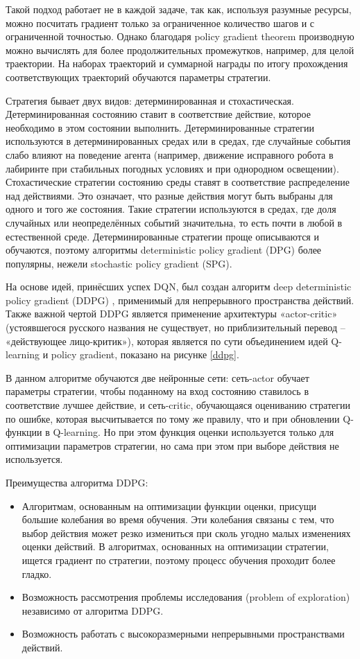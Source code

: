 Такой подход работает не в каждой задаче, так как, используя разумные ресурсы, можно посчитать градиент только за ограниченное количество шагов и с ограниченной точностью. Однако благодаря policy gradient theorem производную можно вычислять для более продолжительных промежутков, например, для целой траектории. На наборах траекторий и суммарной награды по итогу прохождения соответствующих траекторий обучаются параметры стратегии.

Стратегия бывает двух видов: детерминированная и стохастическая. Детерминированная состоянию ставит в соответствие действие, которое необходимо в этом состоянии выполнить. Детерминированные стратегии используются в детерминированных средах или в средах, где случайные события слабо влияют на поведение агента (например, движение исправного робота в лабиринте при стабильных погодных условиях и при однородном освещении). Стохастические стратегии состоянию среды ставят в соответствие распределение над действиями. Это означает, что разные действия могут быть выбраны для одного и того же состояния. Такие стратегии используются в средах, где доля случайных или неопределённых событий значительна, то есть почти в любой в естественной среде. Детерминированные стратегии проще описываются и обучаются, поэтому алгоритмы deterministic policy gradient (DPG) более популярны, нежели stochastic policy gradient (SPG).

На основе идей, принёсших успех DQN, был создан алгоритм deep deterministic policy gradient (DDPG) \cite{ddpg}, применимый для непрерывного пространства действий. Также важной чертой DDPG является применение архитектуры «actor-critic» (устоявшегося русского названия не существует, но приблизительный перевод – «действующее лицо-критик»), которая является по сути объединением идей Q-learning и policy gradient, показано на рисунке \ref{ddpg}. 

В данном алгоритме обучаются две нейронные сети: сеть-actor обучает параметры стратегии, чтобы поданному на вход состоянию ставилось в соответствие лучшее действие, и сеть-critic, обучающаяся оцениванию стратегии по ошибке, которая высчитывается по тому же правилу, что и при обновлении Q-функции в Q-learning. Но при этом функция оценки используется только для оптимизации параметров стратегии, но сама при этом при выборе действия не используется. 

Преимущества алгоритма DDPG:
\begin{itemize}
	\item Алгоритмам, основанным на оптимизации функции оценки, присущи большие колебания во время обучения. Эти колебания связаны с тем, что выбор действия может резко измениться при сколь угодно малых изменениях оценки действий. В алгоритмах, основанных на оптимизации стратегии, ищется градиент по стратегии, поэтому процесс обучения проходит более гладко.
	\item Возможность рассмотрения проблемы исследования (problem of exploration) независимо от алгоритма DDPG.
	\item Возможность работать с высокоразмерными непрерывными пространствами действий.
\end{itemize}

